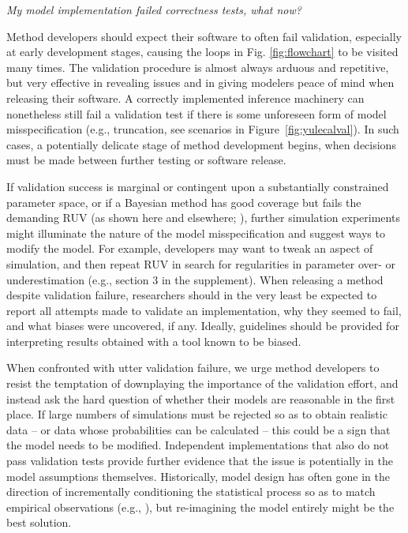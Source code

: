 \documentclass[oneside]{article}
\begin{document}
\vspace{.25cm}

\noindent \emph{My model implementation failed correctness tests, what now?}

Method developers should expect their software to often fail validation, especially at early development stages, causing the loops in Fig. \ref{fig:flowchart} to be visited many times.
The validation procedure is almost always arduous and repetitive, but very effective in revealing issues and in giving modelers peace of mind when releasing their software.
A correctly implemented inference machinery can nonetheless still fail a validation test if there is some unforeseen form of model misspecification (e.g., truncation, see scenarios in Figure~\ref{fig:yulecalval}).
In such cases, a potentially delicate stage of method development begins, when decisions must be made between further testing or software release.

If validation success is marginal or contingent upon a substantially constrained parameter space, or if a Bayesian method has good coverage but fails the demanding RUV (as shown here and elsewhere; \citealp{mchugh22}), further simulation experiments might illuminate the nature of the model misspecification and suggest ways to modify the model.
For example, developers may want to tweak an aspect of simulation, and then repeat RUV in search for regularities in parameter over- or underestimation (e.g., section 3 in the supplement).
When releasing a method despite validation failure, researchers should in the very least be expected to report all attempts made to validate an implementation, why they seemed to fail, and what biases were uncovered, if any.
Ideally, guidelines should be provided for interpreting results obtained with a tool known to be biased.

When confronted with utter validation failure, we urge method developers to resist the temptation of downplaying the importance of the validation effort, and instead ask the hard question of whether their models are reasonable in the first place.
If large numbers of simulations must be rejected so as to obtain realistic data -- or data whose probabilities can be calculated -- this could be a sign that the model needs to be modified. 
Independent implementations that also do not pass validation tests provide further evidence that the issue is potentially in the model assumptions themselves.
Historically, model design has often gone in the direction of incrementally conditioning the statistical process so as to match empirical observations (e.g., \citealp{Gelman1996,Gelman2020}), but re-imagining the model entirely might be the best solution.
\end{document}

